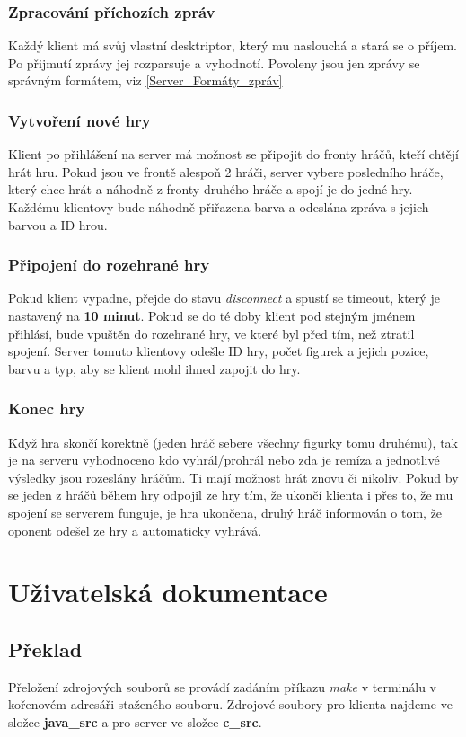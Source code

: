 \documentclass[12pt, a4paper]{article}
\begin{document}
\subsubsection{Zpracování příchozích zpráv}
\label{Server_Zpracování_příchozích_zpráv}
Každý klient má svůj vlastní desktriptor, který mu naslouchá a stará se o příjem. Po přijmutí zprávy jej rozparsuje a vyhodnotí. Povoleny jsou jen zprávy se správným formátem, viz \ref{Server_Formáty_zpráv}
\subsubsection{Vytvoření nové hry}
\label{Vytvoření_nové_hry}
Klient po přihlášení na server má možnost se připojit do fronty hráčů, kteří chtějí hrát hru. Pokud jsou ve frontě alespoň 2 hráči, server vybere posledního hráče, který chce hrát a náhodně z fronty druhého hráče a spojí je do jedné hry. Každému klientovy bude náhodně přiřazena barva a odeslána zpráva s jejich barvou a ID hrou.
\subsubsection{Připojení do rozehrané hry}
\label{Připojení_do_rozehrané_hry}
Pokud klient vypadne, přejde do stavu \textit{disconnect} a spustí se timeout, který je nastavený na \textbf{10 minut}. Pokud se do té doby klient pod stejným jménem přihlásí, bude vpuštěn do rozehrané hry, ve které byl před tím, než ztratil spojení. Server tomuto klientovy odešle ID hry, počet figurek a jejich pozice, barvu a typ, aby se klient mohl ihned zapojit do hry.
\subsubsection{Konec hry}
\label{Konec_hry}
Když hra skončí korektně (jeden hráč sebere všechny figurky tomu druhému), tak je na serveru vyhodnoceno kdo vyhrál/prohrál nebo zda je remíza a jednotlivé výsledky jsou rozeslány hráčům. Ti mají možnost hrát znovu či nikoliv. Pokud by se jeden z hráčů během hry odpojil ze hry tím, že ukončí klienta i přes to, že mu spojení se serverem funguje, je hra ukončena, druhý hráč informován o tom, že oponent odešel ze hry a automaticky vyhrává.
\section{Uživatelská dokumentace}
\label{Uživatelská_dokumentace}
\subsection{Překlad}
\label{Překlad}
Přeložení zdrojových souborů se provádí zadáním příkazu \textit{make} v terminálu v kořenovém adresáři staženého souboru. Zdrojové soubory pro klienta najdeme ve složce \textbf{\/java\_src\/} a pro server ve složce \textbf{\/c\_src\/}.
\end{document}
